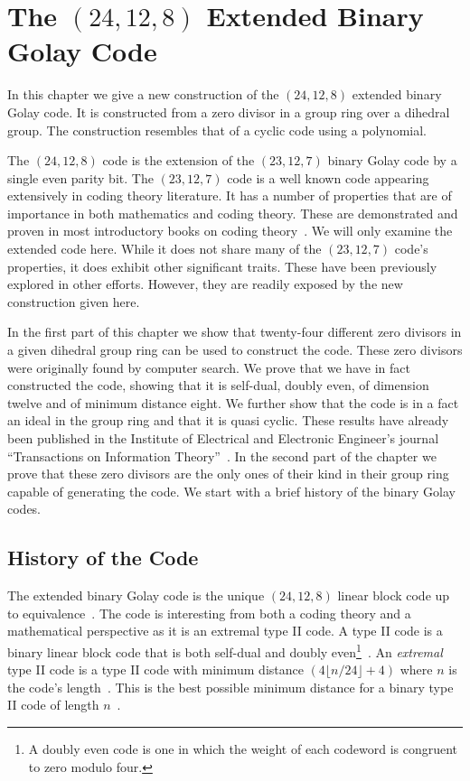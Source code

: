 \chapter{The $(24,12,8)$ Extended Binary Golay Code}
\label{chap:extgolaycode}
In this chapter we give a new construction of the $(24,12,8)$ extended binary Golay code.
It is constructed from a zero divisor in a group ring over a dihedral group.
The construction resembles that of a cyclic code using a polynomial.

The $(24,12,8)$ code is the extension of the $(23,12,7)$ binary Golay code by a single even parity bit.
The $(23,12,7)$ code is a well known code appearing extensively in coding theory literature.
It has a number of properties that are of importance in both mathematics and coding theory.
These are demonstrated and proven in most introductory books on coding theory~\cite{huf03}.
We will only examine the extended code here.
While it does not share many of the $(23,12,7)$ code's properties, it does exhibit other significant traits.
These have been previously explored in other efforts.
However, they are readily exposed by the new construction given here.

In the first part of this chapter we show that twenty-four different zero divisors in a given dihedral group ring can be used to construct the code.
These zero divisors were originally found by computer search.
We prove that we have in fact constructed the code, showing that it is self-dual, doubly even, of dimension twelve and of minimum distance eight.
We further show that the code is in a fact an ideal in the group ring and that it is quasi cyclic.
These results have already been published in the Institute of Electrical and Electronic Engineer's journal ``Transactions on Information Theory''~\cite{mcl08}.
In the second part of the chapter we prove that these zero divisors are the only ones of their kind in their group ring capable of generating the code.
We start with a brief history of the binary Golay codes.


\section{History of the Code}
The extended binary Golay code is the unique $(24,12,8)$ linear block code up to equivalence~\cite[p.~401]{huf03}.
The code is interesting from both a coding theory and a mathematical perspective as it is an extremal type II code.
A type II code is a binary linear block code that is both self-dual and doubly even\footnote{A doubly even code is one in which the weight of each codeword is congruent to zero modulo four.}~\cite[p.~339]{huf03}.
An \emph{extremal} type II code is a type II code with minimum distance $(4\lfloor n/24 \rfloor + 4)$ where $n$ is the code's length~\cite[p.~346]{huf03}.
This is the best possible minimum distance for a binary type II code of length $n$~\cite[p.~344]{huf03}.

